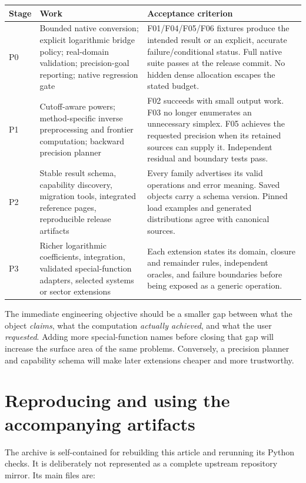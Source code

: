\documentclass[11pt,a4paper]{article}
\begin{document}
\begin{longtable}{@{}L{14mm}L{63mm}L{78mm}@{}}
\toprule Stage & Work & Acceptance criterion\\\midrule\endhead
P0 & Bounded native conversion; explicit logarithmic bridge policy; real-domain validation; precision-goal reporting; native regression gate & F01/F04/F05/F06 fixtures produce the intended result or an explicit, accurate failure/conditional status. Full native suite passes at the release commit. No hidden dense allocation escapes the stated budget.\\
P1 & Cutoff-aware powers; method-specific inverse preprocessing and frontier computation; backward precision planner & F02 succeeds with small output work. F03 no longer enumerates an unnecessary simplex. F05 achieves the requested precision when its retained sources can supply it. Independent residual and boundary tests pass.\\
P2 & Stable result schema, capability discovery, migration tools, integrated reference pages, reproducible release artifacts & Every family advertises its valid operations and error meaning. Saved objects carry a schema version. Pinned load examples and generated distributions agree with canonical sources.\\
P3 & Richer logarithmic coefficients, integration, validated special-function adapters, selected systems or sector extensions & Each extension states its domain, closure and remainder rules, independent oracles, and failure boundaries before being exposed as a generic operation.\\
\bottomrule
\end{longtable}

The immediate engineering objective should be a smaller gap between what the object \emph{claims}, what the computation \emph{actually achieved}, and what the user \emph{requested}. Adding more special-function names before closing that gap will increase the surface area of the same problems. Conversely, a precision planner and capability schema will make later extensions cheaper and more trustworthy.

\section{Reproducing and using the accompanying artifacts}\label{sec:reproduction}

The archive is self-contained for rebuilding this article and rerunning its Python checks. It is deliberately not represented as a complete upstream repository mirror. Its main files are:
\end{document}
